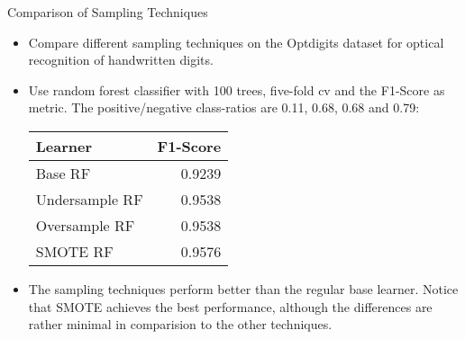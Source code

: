 \documentclass[11pt,compress,t,notes=noshow, xcolor=table]{beamer}
\begin{document}
 	\begin{frame}{Comparison of Sampling Techniques}

		\small

		\begin{itemize}
		
			\item Compare different sampling techniques on the Optdigits dataset for optical recognition of handwritten digits.
		
			\item Use random forest classifier with 100 trees, five-fold cv and the F1-Score as metric. The positive/negative class-ratios are 0.11, 0.68, 0.68 and 0.79:
               \begin{center}
                 \begin{tabular}{lr}
                 \toprule
                 Learner & F1-Score\\
                 \midrule
                 Base RF & 0.9239\\
                 Undersample RF & 0.9538\\
                 Oversample RF & 0.9538\\
                 SMOTE RF & 0.9576\\
                 \bottomrule
                 \end{tabular}    
                \end{center}
                
			\item The sampling techniques perform better than the regular base learner. Notice that SMOTE achieves the best performance, although the differences are rather minimal in comparision to the other techniques.

		\end{itemize}		

	\end{frame}


	\endlecture
\end{document}
